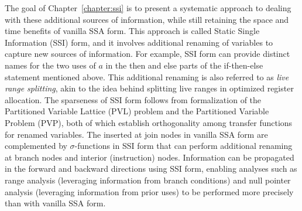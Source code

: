 The goal of Chapter~\ref{chapter:ssi} is to present a systematic approach to dealing with these additional sources of information, while still retaining the space and time benefits of vanilla SSA form. 
This approach is called Static Single Information (SSI) form, and it involves additional renaming of variables to capture new sources of information. 
For example, SSI form can provide distinct names for the two uses of $a$ in the then and else parts of the if-then-else statement mentioned above. 
This additional renaming is also referred to as {\em live range splitting}, akin to the idea behind splitting live ranges in optimized register allocation. 
The sparseness of SSI form follows from formalization of the Partitioned Variable Lattice (PVL) problem and the Partitioned Variable Problem (PVP), both of which establish orthogonality among transfer functions for renamed variables. 
The \phifun inserted at join nodes in vanilla SSA form are complemented by $\sigma$-functions in SSI form that can perform additional renaming at branch nodes and interior (instruction) nodes. 
Information can be propagated in the forward and backward directions using SSI form, enabling analyses such as range analysis (leveraging information from branch conditions) and null pointer analysis (leveraging information from prior uses) to be performed more precisely than with vanilla SSA form.



